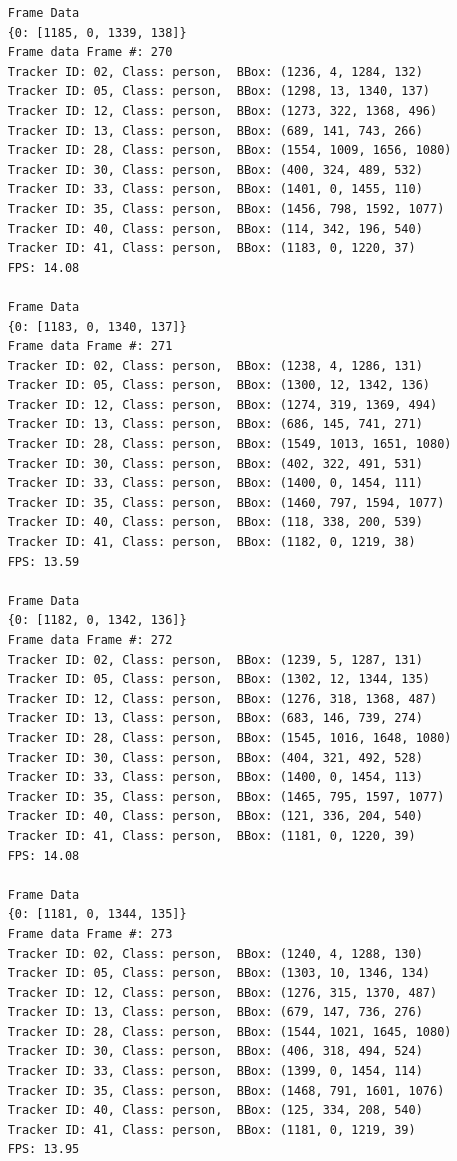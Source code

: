 \documentclass{fisatprojectfinal}
\begin{document}
\begin{verbatim}
    Frame Data
    {0: [1185, 0, 1339, 138]}
    Frame data Frame #: 270
    Tracker ID: 02, Class: person,  BBox: (1236, 4, 1284, 132)
    Tracker ID: 05, Class: person,  BBox: (1298, 13, 1340, 137)
    Tracker ID: 12, Class: person,  BBox: (1273, 322, 1368, 496)
    Tracker ID: 13, Class: person,  BBox: (689, 141, 743, 266)
    Tracker ID: 28, Class: person,  BBox: (1554, 1009, 1656, 1080)
    Tracker ID: 30, Class: person,  BBox: (400, 324, 489, 532)
    Tracker ID: 33, Class: person,  BBox: (1401, 0, 1455, 110)
    Tracker ID: 35, Class: person,  BBox: (1456, 798, 1592, 1077)
    Tracker ID: 40, Class: person,  BBox: (114, 342, 196, 540)
    Tracker ID: 41, Class: person,  BBox: (1183, 0, 1220, 37)
    FPS: 14.08
    
    Frame Data
    {0: [1183, 0, 1340, 137]}
    Frame data Frame #: 271
    Tracker ID: 02, Class: person,  BBox: (1238, 4, 1286, 131)
    Tracker ID: 05, Class: person,  BBox: (1300, 12, 1342, 136)
    Tracker ID: 12, Class: person,  BBox: (1274, 319, 1369, 494)
    Tracker ID: 13, Class: person,  BBox: (686, 145, 741, 271)
    Tracker ID: 28, Class: person,  BBox: (1549, 1013, 1651, 1080)
    Tracker ID: 30, Class: person,  BBox: (402, 322, 491, 531)
    Tracker ID: 33, Class: person,  BBox: (1400, 0, 1454, 111)
    Tracker ID: 35, Class: person,  BBox: (1460, 797, 1594, 1077)
    Tracker ID: 40, Class: person,  BBox: (118, 338, 200, 539)
    Tracker ID: 41, Class: person,  BBox: (1182, 0, 1219, 38)
    FPS: 13.59
    
    Frame Data
    {0: [1182, 0, 1342, 136]}
    Frame data Frame #: 272
    Tracker ID: 02, Class: person,  BBox: (1239, 5, 1287, 131)
    Tracker ID: 05, Class: person,  BBox: (1302, 12, 1344, 135)
    Tracker ID: 12, Class: person,  BBox: (1276, 318, 1368, 487)
    Tracker ID: 13, Class: person,  BBox: (683, 146, 739, 274)
    Tracker ID: 28, Class: person,  BBox: (1545, 1016, 1648, 1080)
    Tracker ID: 30, Class: person,  BBox: (404, 321, 492, 528)
    Tracker ID: 33, Class: person,  BBox: (1400, 0, 1454, 113)
    Tracker ID: 35, Class: person,  BBox: (1465, 795, 1597, 1077)
    Tracker ID: 40, Class: person,  BBox: (121, 336, 204, 540)
    Tracker ID: 41, Class: person,  BBox: (1181, 0, 1220, 39)
    FPS: 14.08
    
    Frame Data
    {0: [1181, 0, 1344, 135]}
    Frame data Frame #: 273
    Tracker ID: 02, Class: person,  BBox: (1240, 4, 1288, 130)
    Tracker ID: 05, Class: person,  BBox: (1303, 10, 1346, 134)
    Tracker ID: 12, Class: person,  BBox: (1276, 315, 1370, 487)
    Tracker ID: 13, Class: person,  BBox: (679, 147, 736, 276)
    Tracker ID: 28, Class: person,  BBox: (1544, 1021, 1645, 1080)
    Tracker ID: 30, Class: person,  BBox: (406, 318, 494, 524)
    Tracker ID: 33, Class: person,  BBox: (1399, 0, 1454, 114)
    Tracker ID: 35, Class: person,  BBox: (1468, 791, 1601, 1076)
    Tracker ID: 40, Class: person,  BBox: (125, 334, 208, 540)
    Tracker ID: 41, Class: person,  BBox: (1181, 0, 1219, 39)
    FPS: 13.95
    

\end{verbatim}
\end{document}
